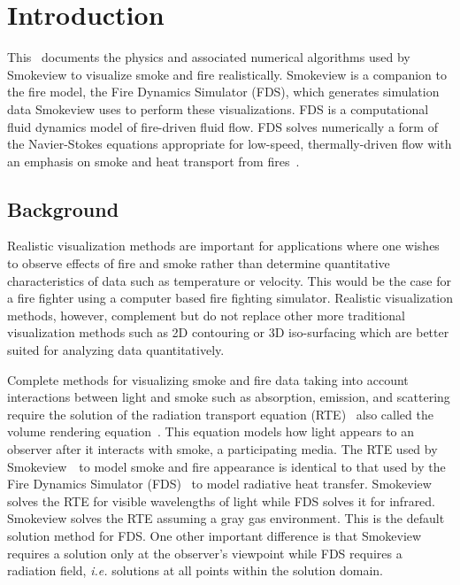 %
%

\section{Introduction}
This \paper\ documents the physics and associated numerical algorithms used by Smokeview\cite{Smokeview_Users_Guide} to visualize smoke and fire realistically.  Smokeview is a companion to the fire model, the Fire Dynamics Simulator (FDS), which generates   simulation data Smokeview uses to perform these visualizations. FDS is a computational fluid dynamics model of fire-driven fluid flow. FDS solves numerically a form of the Navier-Stokes equations appropriate for low-speed, thermally-driven flow with an emphasis on smoke and heat transport from fires~\cite{FDS_Tech_Guide}.

\subsection{Background}

Realistic visualization methods are important for applications where one wishes to observe effects of fire and smoke rather than determine quantitative characteristics of data such as temperature or velocity.  This would be the case for a fire fighter using a computer based fire fighting simulator. Realistic visualization methods, however, complement but do not replace other more traditional visualization methods such as 2D contouring or 3D iso-surfacing which are better suited for analyzing data quantitatively.

Complete methods for visualizing smoke and fire data taking into account interactions between light and smoke such as absorption, emission, and scattering require the solution of the radiation transport equation (RTE)~\cite{Siegel:2001} also called the volume rendering equation~\cite{levoy:1988}. This equation models how light appears to an observer after it interacts with smoke, a participating media. The RTE used by Smokeview~\citesmv\ to model smoke and fire appearance is identical to that used by the Fire Dynamics Simulator (FDS)~\cite{FDS_Tech_Guide} to model radiative heat transfer.  Smokeview solves the RTE for visible wavelengths of light while FDS solves it for infrared. Smokeview solves the RTE assuming a gray gas environment.  This is the default solution method for FDS.  One other important difference is that Smokeview requires a solution only at the observer's viewpoint while FDS requires a radiation field, {\em i.e.} solutions at all points within the solution domain.

